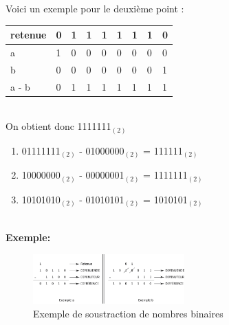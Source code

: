 \begin{Exercice}[15 minutes]
\begin{solution}
Voici un exemple pour le deuxième point : \\
 
\begin{tabular}{| C{0.1\textwidth} | C{0.1\textwidth} | C{0.1\textwidth} | C{0.1\textwidth} | C{0.1\textwidth} | C{0.1\textwidth} | C{0.1\textwidth} | C{0.1\textwidth} | C{0.1\textwidth} |} 
            \hline
	    retenue & 0 & 1 & 1 & 1 & 1 & 1 & 1 & 0 \\ [0.5ex]
	    \hline
            a & 1 & 0 & 0 & 0 & 0 & 0 & 0 & 0 \\ [0.5ex] 
            \hline
            b & 0 & 0 & 0 & 0 & 0 & 0 & 0 & 1 \\ [0.5ex] 
            \hline
            a - b & 0 & 1 & 1 & 1 & 1 & 1 & 1 & 1 \\ [0.5ex]
            \hline
        \end{tabular} \\
 		
 		On obtient donc 1111111$_{(2)}$ \\
 		
 		\begin{enumerate}
        \item 01111111$_{(2)}$ - 01000000$_{(2)}$ = 111111$_{(2)}$
        \item 10000000$_{(2)}$ - 00000001$_{(2)}$ = 1111111$_{(2)}$
        \item 10101010$_{(2)}$ - 01010101$_{(2)}$ = 1010101$_{(2)}$
    \end{enumerate}
    \end{solution}

    \textbf{\\ \faTerminal  Exemple:}
        \begin{figure}[h]
            \centering
            \includegraphics[width=0.52\textwidth]{img/substract.png}
            \caption{Exemple de soustraction de nombres binaires}
        \end{figure}

\end{Exercice}
\newpage
